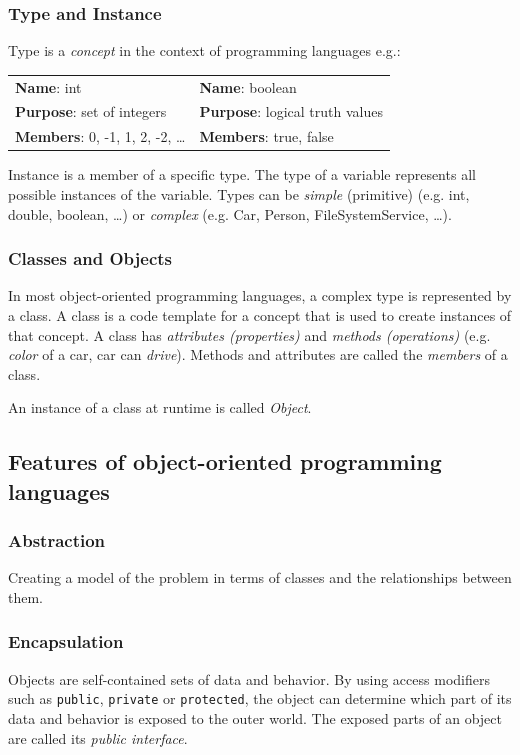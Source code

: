 \subsubsection*{Type and Instance}
Type is a \textit{concept} in the context of programming languages e.g.:
\begin{center}
	\begin{tabular}{ll}
		\textbf{Name}: int & \textbf{Name}: boolean \\
		\textbf{Purpose}: set of integers & \textbf{Purpose}: logical truth values \\
		\textbf{Members}: 0, -1, 1, 2, -2, \dots & \textbf{Members}: true, false \\
	\end{tabular}
\end{center}

Instance is a member of a specific type.
The type of a variable represents all possible instances of the variable.
Types can be \textit{simple} (primitive) (e.g. int, double, boolean, \dots) or \textit{complex} (e.g. Car, Person, FileSystemService, \dots).

\subsubsection*{Classes and Objects}
In most object-oriented programming languages, a complex type is represented by a class.
A class is a code template for a concept that is used to create instances of that concept.
A class has \textit{attributes (properties)} and \textit{methods (operations)} (e.g. \textit{color} of a car, car can \textit{drive}).
Methods and attributes are called the \textit{members} of a class.\newline

An instance of a class at runtime is called \textit{Object}.


\subsection{Features of object-oriented programming languages}
\subsubsection*{Abstraction}
Creating a model of the problem in terms of classes and the relationships between them.

\subsubsection*{Encapsulation}
Objects are self-contained sets of data and behavior.
By using access modifiers such as \texttt{public}, \texttt{private} or \texttt{protected}, the object can determine which part of its data and behavior is exposed to the outer world.
The exposed parts of an object are called its \textit{public interface}.

